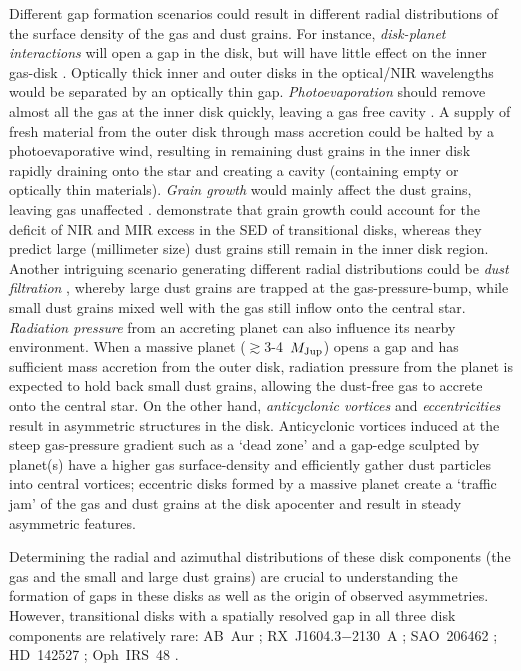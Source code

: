 \documentclass[apj]{emulateapj-rtx4}
\begin{document}
  Different gap formation scenarios could result in different radial distributions of the surface density 
  of the gas and dust grains. 
  For instance, {\it disk-planet interactions} will open a gap in the disk, but will have little effect 
  on the inner gas-disk \citep[e.g.,][]{zhu11}. Optically thick inner and outer disks in the optical/NIR wavelengths 
  would be separated by an optically thin gap.
  {\it Photoevaporation} should remove almost all the gas at the inner disk quickly, leaving a gas free cavity \citep[e.g.,][]{alex07}. 
  A supply of fresh material from the outer disk through mass accretion could be halted by a photoevaporative wind,
  resulting in remaining dust grains in the inner disk rapidly draining onto the star and creating a cavity
  (containing empty or optically thin materials). 
  {\it Grain growth} would mainly affect the dust grains, leaving gas unaffected \citep[e.g.,][]{dull05}.
  \citet{birn12} demonstrate that grain growth could account for the deficit of NIR and MIR excess in the SED of 
  transitional disks, whereas they predict large (millimeter size) dust grains still remain
  in the inner disk region. 
  Another intriguing scenario generating different radial distributions
  could be {\it dust filtration} \citep[e.g.,][]{rice06}, whereby large dust grains are trapped at the gas-pressure-bump,
  while small dust grains mixed well
  with the gas still inflow onto the central star.
  {\it Radiation pressure} from an accreting planet \citep{owen14} can also influence its nearby environment. When a massive planet 
  ($\gtrsim$3-4~$M_{\rm Jup}$) opens a gap and has sufficient mass accretion from the outer disk, radiation pressure
  from the planet is expected to hold back small dust grains, allowing the dust-free gas to accrete onto the central star.
  On the other hand, {\it anticyclonic vortices} \citep{rega12} and {\it eccentricities} \citep{kley06}
  result in asymmetric structures in the disk.  Anticyclonic vortices induced at the steep gas-pressure gradient such as a `dead zone' \citep{gamm96} and a gap-edge sculpted by
  planet(s) have a higher gas surface-density and efficiently gather dust particles into central vortices; 
  eccentric disks formed by a massive planet create a `traffic jam' of the gas and dust grains at the disk apocenter and 
  result in steady asymmetric features.
  
  
  Determining the radial and azimuthal 
  distributions of these disk components (the gas and the small and large dust grains) are crucial
  to understanding the formation of gaps in these disks as well as the origin of observed asymmetries. 
  However, transitional disks with a spatially resolved gap in all three disk components
  are relatively rare: AB~Aur \citep{piet05,hash11,tang12}; RX~J1604.3$-$2130~A \citep{math12,maya12}; SAO~206462 
  \citep[e.g.,][]{brow09,lyo11,garu13,pere14}; HD~142527 \citep[e.g.,][]{fuka06,casa13}; 
  Oph~IRS~48 \citep[e.g.,][Follette et~al. in prep.]{geer07,brow12,vand13,brud14}.
\end{document}

